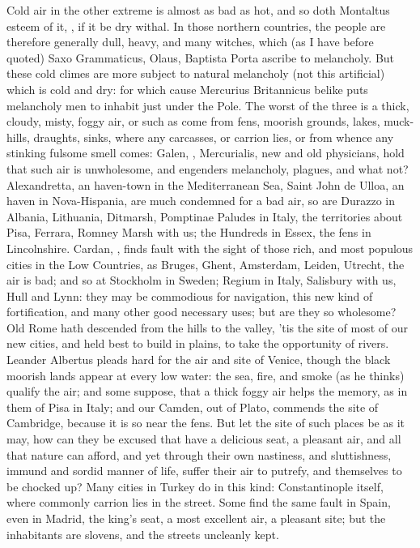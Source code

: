 Cold air in the other extreme is almost as bad as hot, and so doth Montaltus
esteem of it, , if it be dry withal. In those
northern countries, the people are therefore generally dull, heavy, and many
witches, which (as I have before quoted) Saxo Grammaticus, Olaus, Baptista
Porta ascribe to melancholy. But these cold climes are more subject to natural
melancholy (not this artificial) which is cold and dry: for which cause
Mercurius Britannicus belike puts melancholy men to
inhabit just under the Pole. The worst of the three is a
thick, cloudy, misty, foggy air, or such as come from
fens, moorish grounds, lakes, muck-hills, draughts, sinks, where any carcasses,
or carrion lies, or from whence any stinking fulsome smell comes: Galen,
\Avicenna{}, Mercurialis, new and old physicians, hold that such air is
unwholesome, and engenders melancholy, plagues, and what not?
Alexandretta, an haven-town in the Mediterranean Sea,
Saint John de Ulloa, an haven in Nova-Hispania, are much condemned for a bad
air, so are Durazzo in Albania, Lithuania, Ditmarsh, Pomptinae Paludes in
Italy, the territories about Pisa, Ferrara, \etc{} Romney Marsh with us; the
Hundreds in Essex, the fens in Lincolnshire. Cardan, , finds fault with the sight of those rich, and
most populous cities in the Low Countries, as Bruges, Ghent, Amsterdam, Leiden,
Utrecht, \etc{} the air is bad; and so at Stockholm in Sweden; Regium in Italy,
Salisbury with us, Hull and Lynn: they may be commodious for navigation, this
new kind of fortification, and many other good necessary uses; but are they so
wholesome? Old Rome hath descended from the hills to the valley, 'tis the site
of most of our new cities, and held best to build in plains, to take the
opportunity of rivers. Leander Albertus pleads hard for the air and site of
Venice, though the black moorish lands appear at every low water: the sea,
fire, and smoke (as he thinks) qualify the air; and some
suppose, that a thick foggy air helps the memory, as in them of Pisa in Italy;
and our Camden, out of Plato, commends the site of Cambridge, because it is so
near the fens. But let the site of such places be as it may, how can they be
excused that have a delicious seat, a pleasant air, and all that nature can
afford, and yet through their own nastiness, and sluttishness, immund and
sordid manner of life, suffer their air to putrefy, and themselves to be
chocked up? Many cities in Turkey do  in this kind:
Constantinople itself, where commonly carrion lies in the street. Some find the
same fault in Spain, even in Madrid, the king's seat, a most excellent air, a
pleasant site; but the inhabitants are slovens, and the streets uncleanly kept.

